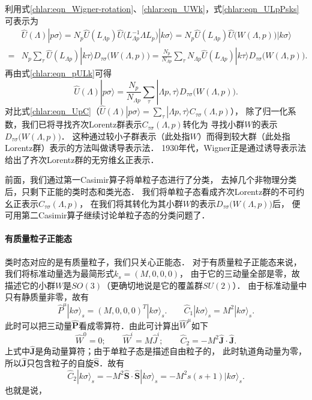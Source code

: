 利用式\eqref{chlar:eqn_Wigner-rotation}、\eqref{chlar:eqn_UWk}，式\eqref{chlar:eqn_ULpPsks}可表示为
\begin{align*}
	&\hat{U}(\Lambda) |p\sigma\rangle =
	N_p \hat{U}(L_{\Lambda p}) \hat{U}\bigl(L^{-1}_{\Lambda p}\Lambda L_p\bigr) |k\sigma\rangle 
	=N_p \hat{U}(L_{\Lambda p}) \hat{U}\bigl(W(\Lambda,p)\bigr) |k\sigma\rangle  \\
	=& N_p \sum_{\tau} \hat{U}(L_{\Lambda p}) |k\tau \rangle D_{\tau\sigma} \bigl(W(\Lambda,p)\bigr)  
	=	\frac{N_p}{N_{\Lambda p}} \sum_{\tau} N_{\Lambda p}\hat{U}(L_{\Lambda p}) 
	|k\tau \rangle D_{\tau\sigma} \bigl(W(\Lambda,p)\bigr) .
\end{align*}
再由式\eqref{chlar:eqn_pULk}可得
\begin{equation}\label{chlar:eqn_UpWkD}
	\hat{U}(\Lambda) |p\sigma\rangle = \frac{N_p}{N_{\Lambda p}} \sum_{\tau} 
	|\Lambda p, \tau \rangle D_{\tau\sigma} \bigl(W(\Lambda,p)\bigr) .
\end{equation}
对比式\eqref{chlar:eqn_UpC}（$\hat{U}(\Lambda) |p\sigma\rangle = 
\sum_{\tau} |\Lambda p,\tau \rangle C_{\tau\sigma}(\Lambda,p)$），
除了归一化系数，我们已将寻找齐次Lorentz群表示$C_{\tau\sigma}(\Lambda,p)$转化为
寻找小群$W$的表示$D_{\tau\sigma} \bigl(W(\Lambda,p)\bigr)$．
这种通过较小子群表示（此处指$W$）而得到较大群（此处指Lorentz群）表示的方法叫做{\kaishu 诱导表示法}．
1930年代，Wigner正是通过诱导表示法给出了齐次Lorentz群的无穷维幺正表示．


前面，我们通过第一Casimir算子将单粒子态进行了分类，
去掉几个非物理分类后，只剩下正能的{\kaishu 类时态}和{\kaishu 类光态}．
我们将单粒子态看成齐次Lorentz群的不可约幺正表示$C_{\tau\sigma}(\Lambda,p)$，
在我们将其转化为其小群$W$的表示$D_{\tau\sigma} \bigl(W(\Lambda,p)\bigr)$后，
便可用第二Casimir算子继续讨论单粒子态的分类问题了．

\paragraph{有质量粒子正能态}
类时态对应的是有质量粒子，我们只关心正能态．
对于有质量粒子正能态来说，我们将标准动量选为最简形式$k_s=(M,0,0,0)$，
由于它的三动量全部是零，故描述它的小群$W$是$SO(3)$（更确切地说是它的覆盖群$SU(2)$）．
由于标准动量中只有静质量非零，故有
\begin{equation}
	\hat{P}^\mu |k\sigma\rangle_s = (M,0,0,0)^T |k\sigma\rangle_s.    \qquad
	\hat{C}_1 |k\sigma\rangle_s = M^2 |k\sigma\rangle_s.
\end{equation}
此时可以把三动量$\hat{\boldsymbol{P}}$看成零算符．由此可计算出$\hat{W}^\mu$如下
\begin{equation}
	\hat{W}^0=0;\qquad  \hat{W}^i =  M {\hat{J}}^i ;\qquad  
	\hat{C}_2=- M^2 \boldsymbol{\hat{J}}\cdot\boldsymbol{\hat{J}}.
\end{equation}
上式中$\boldsymbol{\hat{J}}$是角动量算符；由于单粒子态是描述自由粒子的，
此时轨道角动量为零，所以$\boldsymbol{\hat{J}}$只包含粒子的自旋$\boldsymbol{\hat{S}}$．故有
\begin{equation}
	\hat{C}_2 |k\sigma\rangle_s =-M^2 \boldsymbol{\hat{S}}\cdot\boldsymbol{\hat{S}}
	|k\sigma\rangle_s =- M^2 s(s+1)|k\sigma\rangle_s.
\end{equation}
也就是说，

